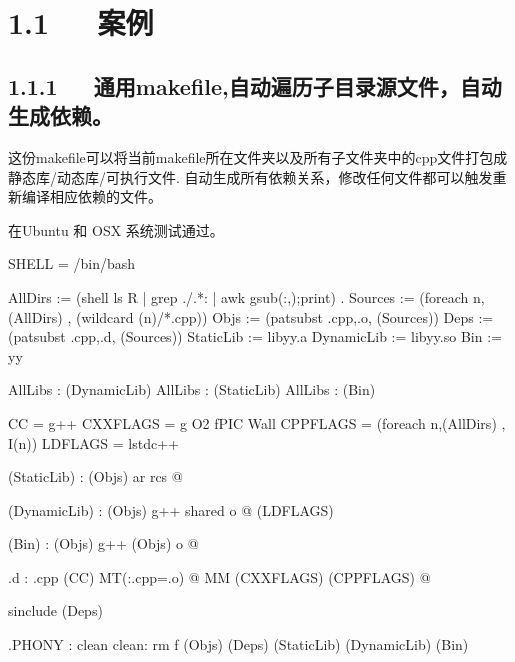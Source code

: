 \documentclass[letterpaper,12pt,english]{sphinxmanual}
\begin{document}


\section{1.1   案例}
\label{\detokenize{004.study/001._u7f16_u7a0b/001.make/makefile:id2}}

\subsection{1.1.1   通用makefile,自动遍历子目录源文件，自动生成依赖。}
\label{\detokenize{004.study/001._u7f16_u7a0b/001.make/makefile:makefile}}

这份makefile可以将当前makefile所在文件夹以及所有子文件夹中的cpp文件打包成静态库/动态库/可执行文件.
自动生成所有依赖关系，修改任何文件都可以触发重新编译相应依赖的文件。

在Ubuntu 和 OSX 系统测试通过。

\begin{sphinxVerbatim}[commandchars=\\\{\}]
SHELL = /bin/bash

AllDirs := \PYGZdl{}(shell ls \PYGZhy{}R | grep \PYGZsq{}\PYGZca{}\PYGZbs{}./.*:\PYGZdl{}\PYGZdl{}\PYGZsq{} | awk \PYGZsq{}\PYGZob{}gsub(\PYGZdq{}:\PYGZdq{},\PYGZdq{}\PYGZdq{});print\PYGZcb{}\PYGZsq{}) .
Sources := \PYGZdl{}(foreach n,\PYGZdl{}(AllDirs) , \PYGZdl{}(wildcard \PYGZdl{}(n)/*.cpp))
Objs := \PYGZdl{}(patsubst \PYGZpc{}.cpp,\PYGZpc{}.o, \PYGZdl{}(Sources))
Deps := \PYGZdl{}(patsubst \PYGZpc{}.cpp,\PYGZpc{}.d, \PYGZdl{}(Sources))
StaticLib := libyy.a
DynamicLib := libyy.so
Bin := yy

\PYGZsh{}AllLibs : \PYGZdl{}(DynamicLib)
\PYGZsh{}AllLibs : \PYGZdl{}(StaticLib)
AllLibs : \PYGZdl{}(Bin)

CC = g++
CXXFLAGS = \PYGZhy{}g \PYGZhy{}O2 \PYGZhy{}fPIC \PYGZhy{}Wall
CPPFLAGS = \PYGZdl{}(foreach n,\PYGZdl{}(AllDirs) , \PYGZhy{}I\PYGZdl{}(n))
LDFLAGS = \PYGZhy{}lstdc++

\PYGZdl{}(StaticLib) : \PYGZdl{}(Objs)
    ar rcs \PYGZdl{}@ \PYGZdl{}\PYGZca{}

\PYGZdl{}(DynamicLib) : \PYGZdl{}(Objs)
    g++ \PYGZhy{}shared \PYGZhy{}o \PYGZdl{}@ \PYGZdl{}\PYGZca{} \PYGZdl{}(LDFLAGS)

\PYGZdl{}(Bin) : \PYGZdl{}(Objs)
    g++ \PYGZdl{}(Objs) \PYGZhy{}o \PYGZdl{}@

\PYGZpc{}.d : \PYGZpc{}.cpp
    \PYGZdl{}(CC) \PYGZhy{}MT\PYGZdq{}\PYGZdl{}(\PYGZlt{}:.cpp=.o) \PYGZdl{}@\PYGZdq{} \PYGZhy{}MM \PYGZdl{}(CXXFLAGS) \PYGZdl{}(CPPFLAGS) \PYGZdl{}\PYGZlt{} \PYGZgt{} \PYGZdl{}@

sinclude \PYGZdl{}(Deps)

.PHONY : clean
clean:
    rm \PYGZhy{}f \PYGZdl{}(Objs) \PYGZdl{}(Deps) \PYGZdl{}(StaticLib) \PYGZdl{}(DynamicLib) \PYGZdl{}(Bin)
\end{sphinxVerbatim}
\end{document}
